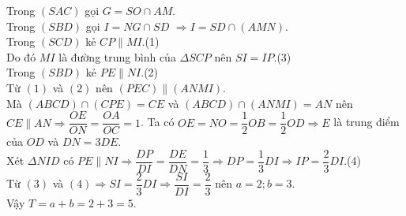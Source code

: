 \begin{ex}
{\begin{center}
\begin{tikzpicture}[scale=1,font=\footnotesize,line join=round,line cap=round,>=stealth]
				\end{tikzpicture}
		\end{center}
		Trong $(SAC)$ gọi  $G=SO\cap AM$.\\
		Trong  $(SBD)$ gọi $I=NG\cap SD$ $\Rightarrow I=SD\cap (AMN)$.\\
		Trong $(SCD)$ kẻ $CP\parallel MI$.\qquad (1)\\ Do đó $MI$ là đường  trung bình của $\Delta SCP$ nên $ SI=IP$.\qquad (3)\\
		 Trong $(SBD)$ kẻ $PE\parallel NI$.\qquad (2)\\
		Từ $(1)$ và $(2)$ nên $(PEC)\parallel (ANMI)$.\\ 
		Mà $(ABCD)\cap (CPE)=CE$ và $(ABCD)\cap (ANMI)=AN$  nên $CE\parallel AN\Rightarrow \dfrac{OE}{ON}=\dfrac{OA}{OC}=1$.
		\noindent Ta có $OE=NO=\dfrac{1}{2}OB=\dfrac{1}{2}OD\Rightarrow E$ là trung điểm  của $OD$ và $DN=3DE$.\\
		Xét $\Delta NID$ có $PE\parallel NI\Rightarrow  \dfrac{DP}{DI}=\dfrac{DE}{DN}=\dfrac{1}{3}\Rightarrow DP=\dfrac{1}{3}DI\Rightarrow IP=\dfrac{2}{3}DI$.\qquad (4)\\
		Từ $(3)$ và $(4)\Rightarrow SI=\dfrac{2}{3}DI\Rightarrow \dfrac{SI}{DI}=\dfrac{2}{3}$ nên  $a=2;b=3$.\\
	Vậy $T=a+b=2+3=5$.} 
\end{ex}

